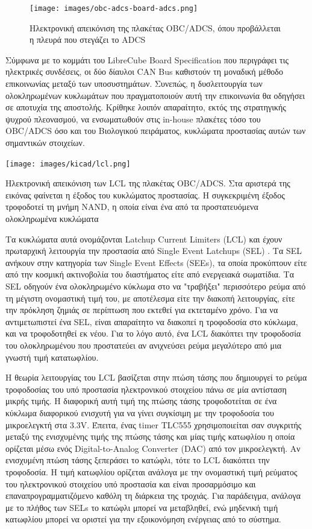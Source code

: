 \documentclass[a4paper,nobib,justified]{tufte-book}
\begin{document}
\begin{figure}
	\centering
	\texttt{[image: images/obc-adcs-board-adcs.png]}
	\caption[Ηλεκτρονική απεικόνιση της πλακέτας OBC/ADCS]{Ηλεκτρονική απεικόνιση της πλακέτας OBC/ADCS, όπου προβάλλεται η πλευρά που στεγάζει το ADCS}
	\label{fig:obc-adcs-board-adcs}
\end{figure}
Σύμφωνα με το κομμάτι του LibreCube Board Specification που περιγράφει τις ηλεκτρικές συνδέσεις, οι δύο δίαυλοι CAN Bus καθιστούν τη μοναδική μέθοδο επικοινωνίας μεταξύ των υποσυστημάτων. Συνεπώς, η δυσλειτουργία των ολοκληρωμένων κυκλωμάτων που πραγματοποιούν αυτή την επικοινωνία θα οδηγήσει σε αποτυχία της αποστολής. Κρίθηκε λοιπόν απαραίτητο, εκτός της στρατηγικής ψυχρού πλεονασμού, να ενσωματωθούν στις in-house πλακέτες τόσο του OBC/ADCS όσο και του Βιολογικού πειράματος, κυκλώματα προστασίας αυτών των σημαντικών στοιχείων. 

\begin{marginfigure}
	\centering
	\texttt{[image: images/kicad/lcl.png]}
	\caption[Ηλεκτρονική απεικόνιση των LCL]{Ηλεκτρονική απεικόνιση των LCL της πλακέτας OBC/ADCS. Στα αριστερά της εικόνας φαίνεται η έξοδος του κυκλώματος προστασίας. Η συγκεκριμένη έξοδος τροφοδοτεί τη μνήμη NAND, η οποία είναι ένα από τα προστατευόμενα ολοκληρωμένα κυκλώματα }
	\label{fig:schematic-lcl}
\end{marginfigure}
Τα κυκλώματα αυτά ονομάζονται Latchup Current Limiters (LCL) και έχουν πρωταρχική λειτουργία την προστασία από Single Event Latchups (SEL) . Tα SEL ανήκουν στην κατηγορία των Single Event Effects (SEEs), τα οποία προκύπτουν είτε από την κοσμική ακτινοβολία του διαστήματος είτε από ενεργειακά σωματίδια. Tα SEL οδηγούν ένα ολοκληρωμένο κύκλωμα στο να "τραβήξει" περισσότερο ρεύμα από τη μέγιστη ονομαστική τιμή του, με αποτέλεσμα είτε την διακοπή λειτουργίας, είτε την πρόκληση ζημιάς σε περίπτωση που εκτεθεί για εκτεταμένο χρόνο. Για να αντιμετωπιστεί ένα SEL, είναι απαραίτητο να διακοπεί η τροφοδοσία στο κύκλωμα, και να τροφοδοτηθεί εκ νέου. Για το λόγο αυτό, ένα LCL διακόπτει την τροφοδοσία του ολοκληρωμένου που προστατεύει αν ανιχνεύσει ρεύμα μεγαλύτερο από μια γνωστή τιμή κατατωφλίου.

Η θεωρία λειτουργίας του LCL βασίζεται στην πτώση τάσης που δημιουργεί το ρεύμα τροφοδοσίας του υπό προστασία ηλεκτρονικού στοιχείου πάνω σε μία αντίσταση μικρής τιμής. Η διαφορική αυτή τιμή της πτώσης τάσης τροφοδοτείται σε ένα κύκλωμα διαφορικού ενισχυτή για να γίνει συγκίσιμη με την τροφοδοσία του μικροελεγκτή στα 3.3V. Έπειτα, ένας timer TLC555 χρησιμοποιείται σαν συγκριτής μεταξύ της ενισχυμένης τιμής της πτώσης τάσης και μίας τιμής κατωφλίου η οποία ορίζεται μέσω ενός Digital-to-Analog Converter (DAC) από τον μικροελεγκτή. Αν ενισχυμένη πτώση τάσης ξεπεράσει το κατώφλι, τότε το LCL διακόπτει την τροφοδοσία. Η τιμή κατωφλίου ορίζεται ανάλογα με την ονομαστική τιμή ρεύματος του ηλεκτρονικού στοιχείου υπό προστασία και είναι προσαρμόσιμο και επαναπρογραμματιζόμενο καθόλη τη διάρκεια της τροχιάς. Για παράδειγμα, ανάλογα με το πλήθος των SELs το κατώφλι μπορεί να μεταβληθεί, ενώ μηδενική τιμή κατωφλίου μπορεί να οριστεί για την εξοικονόμηση ενέργειας από το σύστημα.
\end{document}
